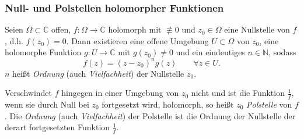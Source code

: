 \documentclass[10pt]{beamer}
\begin{document}
\begin{frame}
	\frametitle{Null- und Polstellen holomorpher Funktionen}
	Seien $\Omega \subset \mathbb{C}$ offen, $f \colon \Omega \to \mathbb{C}$ holomorph mit $\not\equiv 0$ und $z_0 \in \Omega$ eine Nullstelle von $f$, d.h. $f(z_0) = 0$.
	Dann existieren eine offene Umgebung $U \subset \Omega$ von $z_0$, eine holomorphe Funktion $g \colon U \to \mathbb{C}$ mit $g(z_0) \neq 0$ und ein eindeutiges $n \in \mathbb{N}$, sodass
	\[
		f(z) = (z - z_0)^n g(z) \qquad \forall z \in U.
	\]
	$n$ heißt \emph{Ordnung} (auch \emph{Vielfachheit}) der Nullstelle $z_0$.

	\vfill
	Verschwindet $f$ hingegen in einer Umgebung von $z_0$ nicht und ist die Funktion $\frac{1}{f}$, wenn sie durch Null bei $z_0$ fortgesetzt wird, holomorph, so heißt $z_0$ \emph{Polstelle} von $f$.
	Die \emph{Ordnung} (auch \emph{Vielfachheit}) der Polstelle ist die Ordnung der Nullstelle der derart fortgesetzten Funktion $\frac{1}{f}$.
\end{frame}
\end{document}
